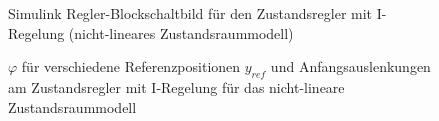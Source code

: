 \begin{figure}[H]
    \centering
    \caption[Regler mit I-Regelung Simulink (nicht-linear)]{Simulink Regler-Blockschaltbild für den Zustandsregler mit I-Regelung (nicht-lineares Zustandsraummodell)}
    \label{fig:Bild36}
\end{figure}

\begin{figure}[H]
    \centering
    \caption[$\varphi$ für Regler mit I-Regelung (nicht-linear)]{$\varphi$ für verschiedene Referenzpositionen $y_{ref}$ und Anfangsauslenkungen am Zustandsregler mit I-Regelung für das nicht-lineare Zustandsraummodell}
    \label{fig:Bild37}
\end{figure}

